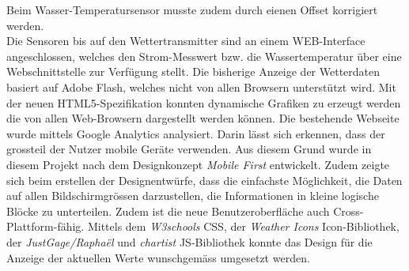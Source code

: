 \documentclass[10pt]{article}
\begin{document}
\begin{multicols}{2}
Beim Wasser-Temperatursensor musste zudem durch eienen Offset korrigiert werden.\\
Die Sensoren bis auf den Wettertransmitter sind an einem WEB-Interface angeschlossen, welches den Strom-Messwert bzw. die Wassertemperatur über eine Webschnittstelle zur Verfügung stellt.
Die bisherige Anzeige der Wetterdaten basiert auf Adobe Flash, welches nicht von allen Browsern unterstützt wird. Mit der neuen HTML5-Spezifikation konnten dynamische Grafiken zu erzeugt werden die von allen Web-Browsern dargestellt werden können. Die bestehende Webseite wurde mittels Google Analytics analysiert. Darin lässt sich erkennen, dass der grossteil der Nutzer mobile Geräte verwenden. Aus diesem Grund wurde in diesem Projekt nach dem Designkonzept \textit{Mobile First} entwickelt. Zudem zeigte sich beim erstellen der Designentwürfe, dass die einfachste Möglichkeit, die Daten auf allen Bildschirmgrössen darzustellen, die Informationen in kleine logische Blöcke zu unterteilen. Zudem ist die neue Benutzeroberfläche auch Cross-Plattform-fähig. Mittels dem \textit{W3schools} CSS, der \textit{Weather Icons} Icon-Bibliothek, der \textit{JustGage/Raphaël} und \textit{chartist} JS-Bibliothek konnte das Design für die Anzeige der aktuellen Werte wunschgemäss umgesetzt werden.

\end{multicols}
\end{document}
